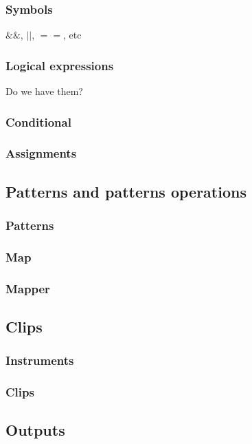 \documentclass[11pt,twoside]{article}
\begin{document}
\subsubsection{Symbols}
$\&\&$, $||$, $==$, etc


\subsubsection{Logical expressions}
Do we have them?


\subsubsection{Conditional}


\subsubsection{Assignments}

\subsection{Patterns and patterns operations}

\subsubsection{Patterns}

\subsubsection{Map}

\subsubsection{Mapper}

\subsection{Clips}

\subsubsection{Instruments}

\subsubsection{Clips}

\subsection{Outputs}
\end{document}
